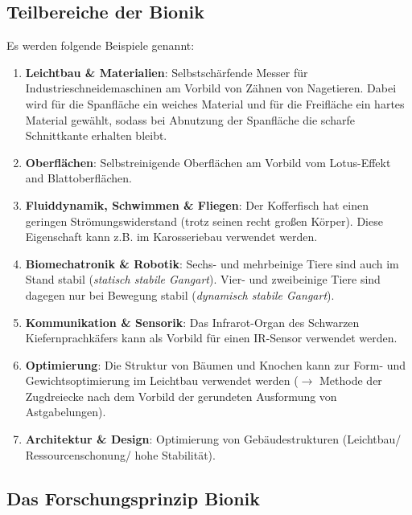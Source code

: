 \subsection{Teilbereiche der Bionik}
Es werden folgende Beispiele genannt:
\begin{enumerate}
	\item \textbf{Leichtbau \& Materialien}: Selbstschärfende Messer für Industrieschneidemaschinen am Vorbild von Zähnen von Nagetieren. Dabei wird für die Spanfläche ein weiches Material und für die Freifläche ein hartes Material gewählt, sodass bei Abnutzung der Spanfläche die scharfe Schnittkante erhalten bleibt.
	\item \textbf{Oberflächen}: Selbstreinigende Oberflächen am Vorbild vom Lotus-Effekt and Blattoberflächen.
	\item \textbf{Fluiddynamik, Schwimmen \& Fliegen}: Der Kofferfisch hat einen geringen Strömungswiderstand (trotz seinen recht großen Körper). Diese Eigenschaft kann z.B. im Karosseriebau verwendet werden.
	\item \textbf{Biomechatronik \& Robotik}: Sechs- und mehrbeinige Tiere sind auch im Stand stabil (\textit{statisch stabile Gangart}). Vier- und zweibeinige Tiere sind dagegen nur bei Bewegung stabil (\textit{dynamisch stabile Gangart}).
	\item \textbf{Kommunikation \& Sensorik}: Das Infrarot-Organ des Schwarzen Kiefernprachkäfers kann als Vorbild für einen IR-Sensor verwendet werden.
	\item \textbf{Optimierung}: Die Struktur von Bäumen und Knochen kann zur Form- und Gewichtsoptimierung im Leichtbau verwendet werden ($\rightarrow$ Methode der Zugdreiecke nach dem Vorbild der gerundeten Ausformung von Astgabelungen).
	\item \textbf{Architektur \& Design}: Optimierung von Gebäudestrukturen (Leichtbau/ Ressourcenschonung/ hohe Stabilität).
\end{enumerate}

\subsection{Das Forschungsprinzip Bionik}

